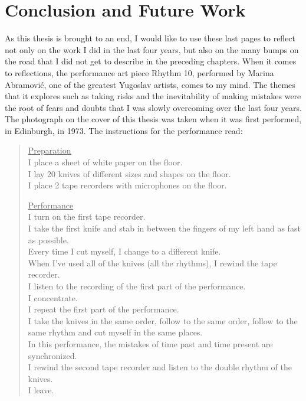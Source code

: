 \chapter{Conclusion and Future Work}
\label{ch:conclusion}
 
As this thesis is brought to an end, I would like to use these last pages to
reflect not only on the work I did in the last four years, but also on the
many bumps on the road that I did not get to describe in the preceding chapters.
When it comes to reflections, the  performance art piece Rhythm 10, performed by
Marina Abramovi\'c,  one of the greatest Yugoslav artists, comes to my mind. The
themes that it explores such as taking risks and the inevitability of making
mistakes were the root of fears and doubts that I was slowly overcoming over the
last four years. The photograph on the cover of this thesis was taken when it
was first performed, in Edinburgh, in 1973. The instructions for the performance read:

\begin{quote}
    \underline{Preparation} \\[1\jot]
    I place a sheet of white paper on the floor.\\
    I lay 20 knives of different sizes and shapes on the floor.\\
    I place 2 tape recorders with microphones on the floor.
    
    \underline{Performance} \\[1\jot]
    I turn on the first tape recorder.\\
    I take the first knife and stab in between the fingers of my left hand as
    fast as possible.\\
    Every time I cut myself, I change to a different knife. \\
    When I've used all of the knives (all the rhythms), I rewind the tape
    recorder. \\ 
    I listen to the recording of the first part of the performance. \\ I
    concentrate. \\
    I repeat the first part of the performance. \\
    I take the knives in the same order, follow to the same order, follow to the
    same rhythm and cut myself in the same places. \\
    In this performance, the mistakes of time past and time present are
    synchronized.\\
    I rewind the second tape recorder and listen to the double rhythm of the
    knives.\\
    I leave.
\end{quote}

